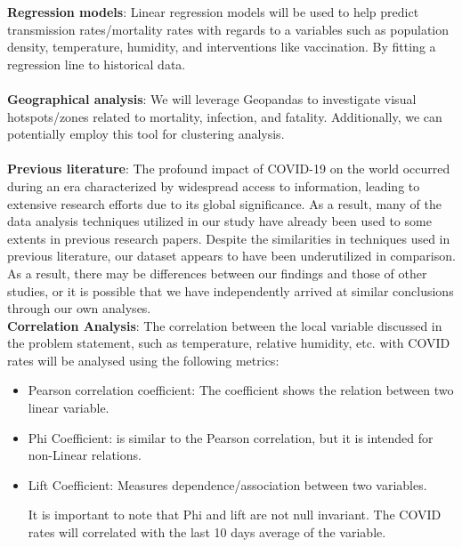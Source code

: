 \documentclass[sigconf,screen,nonacm]{acmart}
\begin{document}
\noindent
\textbf{Regression models}: Linear regression models will be used to help predict transmission rates/mortality rates with regards to a variables such as population density, temperature, humidity, and interventions like vaccination. By fitting a regression line to historical data. \\
\\
\textbf{Geographical analysis}: We will leverage Geopandas to investigate visual hotspots/zones related to mortality, infection, and fatality. Additionally, we can potentially employ this tool for clustering analysis. \\ 
\\
\textbf{Previous literature}: The profound impact of COVID-19 on the world occurred during an era characterized by widespread access to information, leading to extensive research efforts due to its global significance. As a result, many of the data analysis techniques utilized in our study have already been used to some extents in previous research papers. Despite the similarities in techniques used in previous literature, our dataset appears to have been underutilized in comparison. As a result, there may be differences between our findings and those of other studies, or it is possible that we have independently arrived at similar conclusions through our own analyses.
\\
\textbf{Correlation Analysis}: The correlation between the local variable discussed in the problem statement, such as temperature, relative humidity, etc. with COVID rates will be analysed using the following metrics: 
\begin{itemize}

\item Pearson correlation coefficient: The coefficient shows the relation between two linear variable.
\item Phi Coefficient: is similar to the Pearson correlation, but it is intended for non-Linear relations.
\item Lift Coefficient: Measures dependence/association between two variables.

It is important to note that Phi and lift are not null invariant. The COVID rates will correlated with the last 10 days average of the variable.

\end{itemize}
\end{document}
